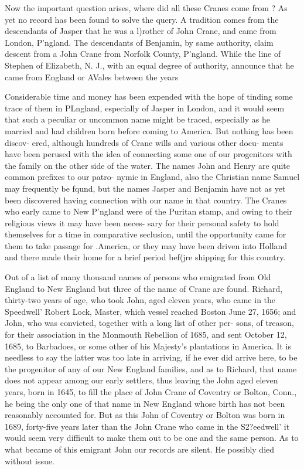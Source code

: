 \documentclass[oneside]{book}
\begin{document}
Now the important question arises, where did all these Cranes 
come from ? As yet no record has been found to solve the query. 
A tradition comes from the descendants of Jasper that he was a 
l)rother of John Crane, and came from London, P'ngland. The 
descendants of Benjamin, by same authority, claim descent from 
a John Crane from Norfolk County, P'ngland. While the line of 
Stephen of Elizabeth, N. J., with an equal degree of authority, 
announce that he came from England or AVales between the years 




Considerable time and money has been expended with the hope 
of tinding some trace of them in PLngland, especially of Jasper in 
London, and it would seem that such a peculiar or uncommon 
name might be traced, especially as he married and had children 
born before coming to America. But nothing has been discov- 
ered, although hundreds of Crane wills and various other docu- 
ments have been perused with the idea of connecting some one of 
our progenitors with the family on the other side of the water. 
The names John and Henry are quite common prefixes to our patro- 
nymic in England, also the Christian name Samuel may frequently 
be fqund, but the names Jasper and Benjamin have not as yet 
been discovered having connection with our name in that country. 
The Cranes who early came to New P'ngland were of the Puritan 
stamp, and owing to their religious views it may have been neces- 
sary for their personal safety to hold themselves for a time in 
comparative seclusion, until the opportunity came for them to 
take passage for .America, or they may have been driven into 
Holland and there made their home for a brief period bef(jre 
shipping for this country. 

Out of a list of many thousand names of persons who emigrated 
from Old England to New England but three of the name of 
Crane are found. Richard, thirty-two years of age, who took 
John, aged eleven years, who came in the Speedwell' Robert 
Lock, Master, which vessel reached Boston June 27, 1656; and 
John, who was convicted, together with a long list of other per- 
sons, of treason, for their association in the Monmouth Rebellion 
of 1685, and sent October 12, 1685, to Barbadoes, or some other 
of his Majesty's plantations in America. It is needless to say the 
latter was too late in arriving, if he ever did arrive here, to be 
the progenitor of any of our New England families, and as to 
Richard, that name does not appear among our early settlers, 
thus leaving the John aged eleven years, born in 1645, to fill the 
place of John Crane of Coventry or Bolton, Conn., he being the 
only one of that name in New England whose birth has not been 
reasonably accounted for. But as this John of Coventry or 
Bolton was born in 1689, forty-five years later than the John 
Crane who came in the S2?eedwell' it would seem very difficult to 
make them out to be one and the same person. As to what 
became of this emigrant John our records are silent. He possibly 
died without issue. 
\end{document}
